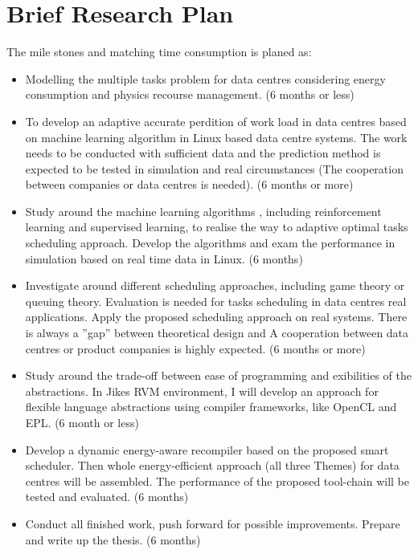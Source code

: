 \section{Brief Research Plan}
\label{sec:timetable}
The mile stones and matching time consumption is planed as:
\begin{itemize}
\item
Modelling the multiple tasks problem for data centres considering energy consumption and physics recourse management. (6 months or less)
\item
To develop an adaptive accurate perdition of work load in data centres based on machine learning algorithm in Linux based data centre systems. The work needs to be conducted with sufficient data and the prediction method is expected to be tested in simulation and real circumstances (The cooperation between companies or data centres is needed). (6 months or more)
\item
Study around the machine learning algorithms \cite{ma}, including reinforcement learning and supervised learning, to realise the way to adaptive optimal tasks scheduling approach. Develop the algorithms and exam the performance in simulation based on real time data in Linux. (6 months)
\item
Investigate around different scheduling approaches, including game theory or queuing theory. Evaluation is needed for tasks scheduling in data centres real applications. Apply the proposed scheduling approach on real systems. There is always a ”gap” between theoretical design and A cooperation between data centres or product companies is highly expected. (6 months or more)
\item
Study around the trade-off between ease of programming and exibilities of the abstractions. In Jikes RVM environment, I will develop an approach for flexible language abstractions using compiler frameworks, like OpenCL and EPL. (6 month or less)
\item
Develop a dynamic energy-aware recompiler based on the proposed smart scheduler. Then whole energy-efficient approach (all three Themes) for data centres will be assembled. The performance of the proposed tool-chain will be tested and evaluated. (6 months) 
\item
Conduct all finished work, push forward for possible improvements. Prepare and write up the thesis. (6 months)
\end{itemize}

